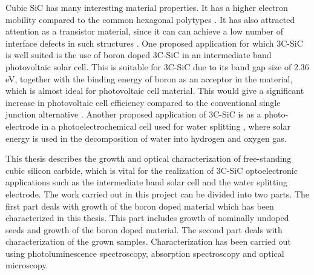 Cubic SiC has many interesting material properties. It has a higher electron mobility compared to the common hexagonal polytypes \cite{Schoner2006}. It has also attracted attention as a transistor material, since it can can achieve a low number of interface defects in such structures \cite{Anzalone2015}. One proposed application for which 3C-SiC is well suited is the use of boron doped 3C-SiC in an intermediate band photovoltaic solar cell. This is suitable for 3C-SiC due to its band gap size of 2.36 eV, together with the binding energy of boron as an acceptor in the material, which is almost ideal for photovoltaic cell material. This would give a significant increase in photovoltaic cell efficiency compared to the conventional single junction alternative \cite{Richards2003,Luque1997}. Another proposed application of 3C-SiC is as a photo-electrode in a photoelectrochemical cell used for water splitting \cite{Kato2014,Yasuda2012}, where solar energy is used in the decomposition of water into hydrogen and oxygen gas. 

This thesis describes the growth and optical characterization of free-standing cubic silicon carbide, which is vital for the realization of 3C-SiC optoelectronic applications such as the intermediate band solar cell and the water splitting electrode. The work carried out in this project can be divided into two parts. The first part deals with growth of the boron doped material which has been characterized in this thesis. This part includes growth of nominally undoped seeds and growth of the boron doped material. The second part deals with characterization of the grown samples. Characterization has been carried out using photoluminescence spectroscopy, absorption spectroscopy and optical microscopy. 

